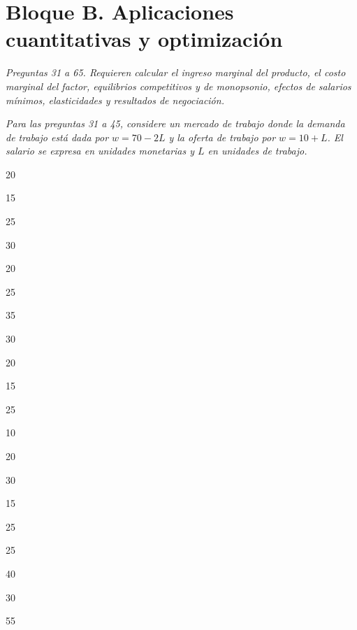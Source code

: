 \section*{Bloque B. Aplicaciones cuantitativas y optimización}

\noindent\textit{Preguntas 31 a 65. Requieren calcular el ingreso marginal del producto, el costo marginal del factor, equilibrios competitivos y de monopsonio, efectos de salarios mínimos, elasticidades y resultados de negociación.}

\noindent\textit{Para las preguntas 31 a 45, considere un mercado de trabajo donde la demanda de trabajo está dada por $w=70-2L$ y la oferta de trabajo por $w=10+L$. El salario se expresa en unidades monetarias y $L$ en unidades de trabajo.}

\begin{opts}
    \item 20
    \item 15
    \item 25
    \item 30
\end{opts}

\begin{opts}
    \item 20
    \item 25
    \item 35
    \item 30
\end{opts}

\begin{opts}
    \item 20
    \item 15
    \item 25
    \item 10
\end{opts}

\begin{opts}
    \item 20
    \item 30
    \item 15
    \item 25
\end{opts}

\begin{opts}
    \item 25
    \item 40
    \item 30
    \item 55
\end{opts}

